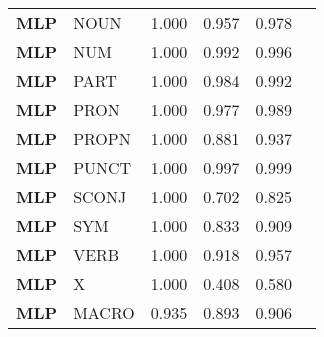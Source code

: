 \begin{table}
\begin{tabular}{|l|l|l|l|l|l|}
\textbf{MLP} & NOUN & 1.000 & 0.957 & 0.978 \\
\textbf{MLP} & NUM & 1.000 & 0.992 & 0.996 \\
\textbf{MLP} & PART & 1.000 & 0.984 & 0.992 \\
\textbf{MLP} & PRON & 1.000 & 0.977 & 0.989 \\
\textbf{MLP} & PROPN & 1.000 & 0.881 & 0.937 \\
\textbf{MLP} & PUNCT & 1.000 & 0.997 & 0.999 \\
\textbf{MLP} & SCONJ & 1.000 & 0.702 & 0.825 \\
\textbf{MLP} & SYM & 1.000 & 0.833 & 0.909 \\
\textbf{MLP} & VERB & 1.000 & 0.918 & 0.957 \\
\textbf{MLP} & X & 1.000 & 0.408 & 0.580 \\
\textbf{MLP} & MACRO & 0.935 & 0.893 & 0.906 \\
\bottomrule
\end{tabular}
\end{table}
